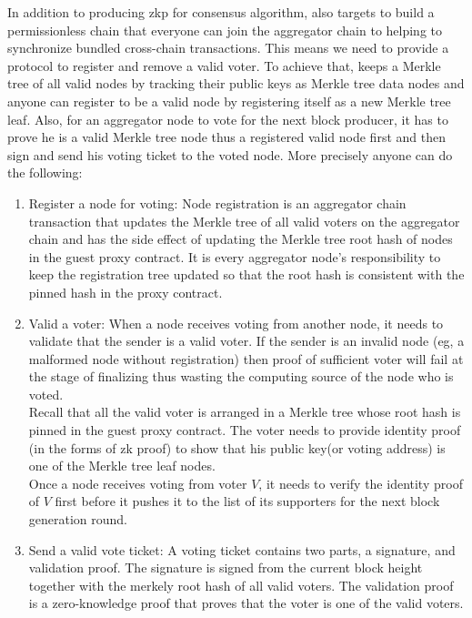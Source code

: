 \documentclass[pageno]{jpaper}
\begin{document}
In addition to producing zkp for consensus algorithm, \dprotocol also targets to build a permissionless chain that everyone can join the aggregator chain to helping to synchronize bundled cross-chain transactions. This means we need to provide a protocol to register and remove a valid voter. To achieve that, \dprotocol keeps a Merkle tree of all valid nodes by tracking their public keys as Merkle tree data nodes and anyone can register to be a valid node by registering itself as a new Merkle tree leaf. Also, for an aggregator node to vote for the next block producer, it has to prove he is a valid Merkle tree node thus a registered valid node first and then sign and send his voting ticket to the voted node. More precisely anyone can do the following:
\begin{enumerate}[leftmargin=*]
\item Register a node for voting:
    Node registration is an aggregator chain transaction that updates the Merkle tree of all valid voters on the aggregator chain and has the side effect of updating the Merkle tree root hash of nodes in the guest proxy contract. It is every aggregator node's responsibility to keep the registration tree updated so that the root hash is consistent with the pinned hash in the proxy contract. \\

\item Valid a voter:
    When a node receives voting from another node, it needs to validate that the sender is a valid voter. If the sender is an invalid node (eg, a malformed node without registration) then proof of sufficient voter will fail at the stage of finalizing thus wasting the computing source of the node who is voted.\\

    Recall that all the valid voter is arranged in a Merkle tree whose root hash is pinned in the guest proxy contract. The voter needs to provide identity proof (in the forms of zk proof) to show that his public key(or voting address) is one of the Merkle tree leaf nodes.\\

    Once a node receives voting from voter $V$, it needs to verify the identity proof of $V$ first before it pushes it to the list of its supporters for the next block generation round.\\

\item Send a valid vote ticket:
    A voting ticket contains two parts, a signature, and validation proof. The signature is signed from the current block height together with the merkely root hash of all valid voters. The validation proof is a zero-knowledge proof that proves that the voter is one of the valid voters. 
\end{enumerate}
\end{document}
